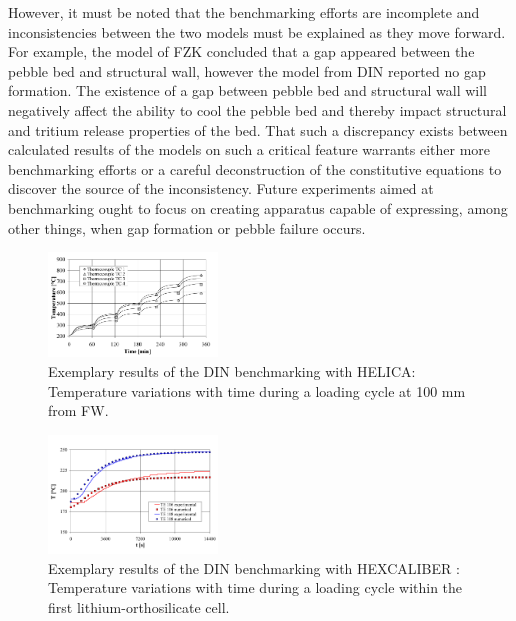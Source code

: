 However, it must be noted that the benchmarking efforts are incomplete and inconsistencies between the two models must be explained as they move forward. For example, the model of FZK concluded that a gap appeared between the pebble bed and structural wall, however the model from DIN reported no gap formation. The existence of a gap between pebble bed and structural wall will negatively affect the ability to cool the pebble bed and thereby impact structural and tritium release properties of the bed. That such a discrepancy exists between calculated results of the models on such a critical feature warrants either more benchmarking efforts or a careful deconstruction of the constitutive equations to discover the source of the inconsistency. Future experiments aimed at benchmarking ought to focus on creating apparatus capable of expressing, among other things, when gap formation or pebble failure occurs.


\begin{figure}[t!]
\begin{center}
\includegraphics[width=0.4\textwidth]{chapters/figures/Fig-8}
\caption{Exemplary results of the DIN benchmarking with HELICA: Temperature variations with time during a loading cycle at 100 mm from FW\cite{DellOrco:2007hc}.}
\label{fig:DIN_HELICA}
\end{center}
\end{figure}


 \begin{figure}[t!]
\begin{center}
\includegraphics[width=0.4\textwidth]{chapters/figures/Fig-9}
\caption{Exemplary results of the DIN benchmarking with HEXCALIBER : Temperature variations with time during a loading cycle within the first lithium-orthosilicate cell\cite{DellOrco:2010zr}.}
\label{fig:DIN_HEX}
\end{center}
\end{figure}



